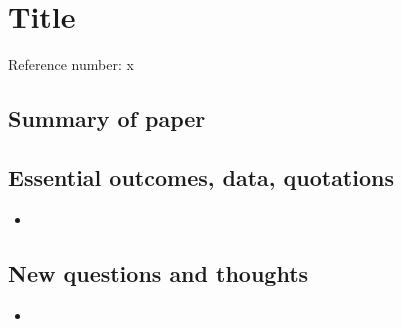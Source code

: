 \section*{Title}
Reference number: x

\subsection*{Summary of paper}

\subsection*{Essential outcomes, data, quotations}
\begin{itemize}
	\item 
\end{itemize}

\subsection*{New questions and thoughts}
\begin{itemize}
	\item 
\end{itemize}
